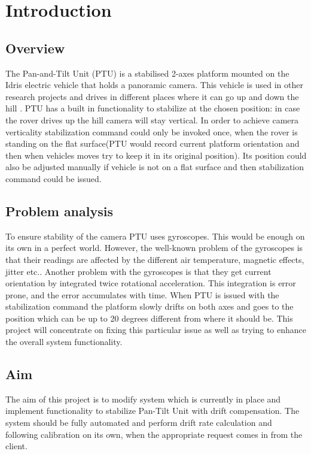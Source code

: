 \chapter{Introduction}

\section{Overview}
The Pan-and-Tilt Unit (PTU) is a stabilised 2-axes platform mounted on the Idris electric vehicle that holds a panoramic camera. This vehicle is used in other research projects and drives in different places where it can go up and down the hill \cite{ProjectIdris}. PTU has a built in functionality to stabilize at the chosen position: in case the rover drives up the hill camera will stay vertical. In order to achieve camera verticality stabilization command could only be invoked once, when the rover is standing on the flat surface(PTU would record current platform orientation and then when vehicles moves try to keep it in its original position). Its position could also be adjusted manually if vehicle is not on a flat surface and then stabilization command could be issued.

\section{Problem analysis}
To ensure stability of the camera PTU uses gyroscopes. This would be enough on its own in a perfect world. However, the well-known problem of the gyroscopes is that their readings are affected by the different air temperature, magnetic effects, jitter etc.\cite{HandbookOfModernSensors}. Another problem with the gyroscopes is that they get current orientation by integrated twice  rotational acceleration. This integration is error prone, and the error accumulates with time. When PTU is issued with the stabilization command the platform slowly drifts on both axes and goes to the position which can be up to 20 degrees different from where it should be. This project will concentrate on fixing this particular issue as well as trying to enhance the overall system functionality. 

\section{Aim}
The aim of this project is to modify system which is currently in place and implement functionality to stabilize Pan-Tilt Unit with drift compensation. The system should be fully automated and perform drift rate calculation and following calibration on its own, when the appropriate request comes in from the client.

